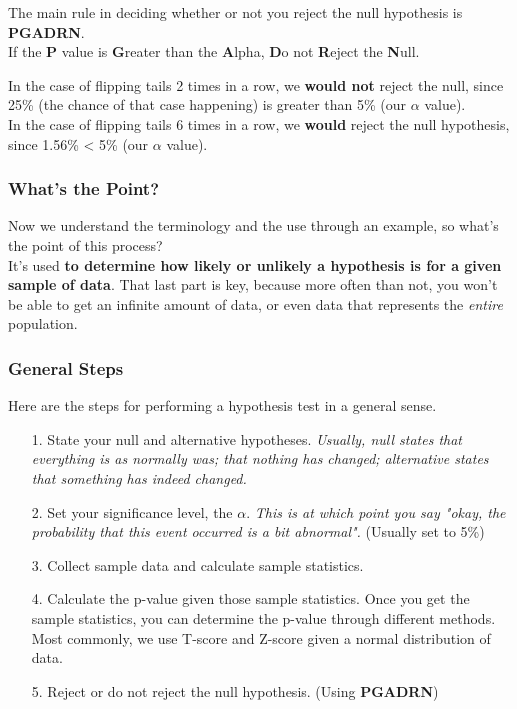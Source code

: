 \documentclass[english, 10pt]{article}
\begin{document}
The main rule in deciding whether or not you reject the null hypothesis is \textbf{PGADRN}.\\

If the \textbf{P} value is \textbf{G}reater than the \textbf{A}lpha, \textbf{D}o not \textbf{R}eject the \textbf{N}ull.\\

\begin{myproof}
In the case of flipping tails 2 times in a row, we \textbf{would not} reject the null, since 25\% (the chance of that case happening) is greater than 5\% (our $\alpha$ value).\\

In the case of flipping tails 6 times in a row, we \textbf{would} reject the null hypothesis, since 1.56\% < 5\% (our $\alpha$ value).
\end{myproof}

\subsubsection{What's the Point?}

Now we understand the terminology and the use through an example, so what's the point of this process?\\

It's used \textbf{to determine how likely or unlikely a hypothesis is for a given sample of data}. That last part is key, because more often than not, you won't be able to get an infinite amount of data, or even data that represents the \textit{entire} population.

\subsubsection{General Steps}

Here are the steps for performing a hypothesis test in a general sense.
\begin{itemize}
	\item[1.] State your null and alternative hypotheses. \textit{Usually, null states that everything is as normally was; that nothing has changed; alternative states that something has indeed changed.}
	\item[2.] Set your significance level, the $\alpha$. \textit{This is at which point you say "okay, the probability that this event occurred is a bit abnormal".} (Usually set to 5\%)
	\item[3.] Collect sample data and calculate sample statistics.
	\item[4.] Calculate the p-value given those sample statistics. Once you get the sample statistics, you can determine the p-value through different methods. Most commonly, we use T-score and Z-score given a normal distribution of data.
	\item[5.] Reject or do not reject the null hypothesis. (Using \textbf{PGADRN})
\end{itemize}
\end{document}
